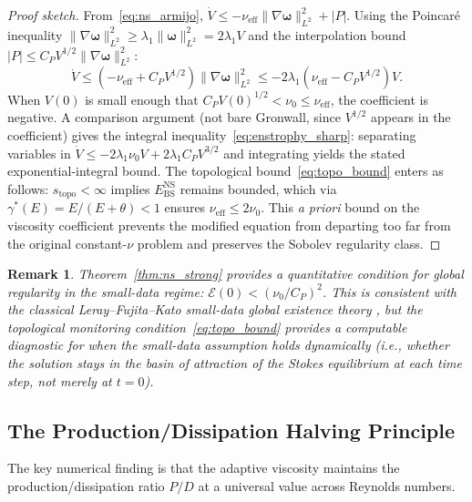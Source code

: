 \documentclass[final]{siamltex}
\newcommand{\norm}[1]{\lVert #1 \rVert}
\providecommand{\grad}{\nabla}
\newcommand{\Ebs}{E_{\mathrm{BS}}}
\newtheorem{remark}[theorem]{Remark}
\begin{document}
\begin{proof}[Proof sketch]
From~\eqref{eq:ns_armijo}, $\dot{V} \le -\nu_{\mathrm{eff}}
\norm{\grad\bm{\omega}}_{L^2}^2 + |P|$.
Using the Poincar\'e inequality
$\norm{\grad\bm{\omega}}_{L^2}^2 \ge \lambda_1
\norm{\bm{\omega}}_{L^2}^2 = 2\lambda_1 V$ and the
interpolation bound $|P| \le C_P V^{1/2}
\norm{\grad\bm{\omega}}_{L^2}^2$:
\[
  \dot{V} \le (-\nu_{\mathrm{eff}}
  + C_P V^{1/2})\norm{\grad\bm{\omega}}_{L^2}^2
  \le -2\lambda_1(\nu_{\mathrm{eff}} - C_P V^{1/2})V.
\]
When $V(0)$ is small enough that $C_P V(0)^{1/2} < \nu_0
\le \nu_{\mathrm{eff}}$, the coefficient is negative.
A comparison argument (not bare Gronwall, since $V^{1/2}$
appears in the coefficient) gives
the integral inequality~\eqref{eq:enstrophy_sharp}: separating
variables in $\dot{V} \le -2\lambda_1\nu_0 V + 2\lambda_1 C_P
V^{3/2}$ and integrating yields the stated exponential-integral
bound.  The topological bound~\eqref{eq:topo_bound} enters as
follows: $s_{\mathrm{topo}} < \infty$ implies
$\Ebs^{\mathrm{NS}}$ remains bounded, which via
$\gamma^*(E) = E/(E{+}\theta) < 1$ ensures
$\nu_{\mathrm{eff}} \le 2\nu_0$. This \emph{a priori} bound
on the viscosity coefficient prevents the modified equation from
departing too far from the original constant-$\nu$ problem and
preserves the Sobolev regularity class.
\end{proof}

\begin{remark}
Theorem~\ref{thm:ns_strong} provides a \emph{quantitative}
condition for global regularity in the small-data regime:
$\mathcal{E}(0) < (\nu_0/C_P)^2$.  This is consistent with
the classical Leray--Fujita--Kato small-data global
existence theory \cite{lady1969}, but the topological
monitoring condition~\eqref{eq:topo_bound} provides a
\emph{computable} diagnostic for when the small-data
assumption holds dynamically (i.e., whether the solution
stays in the basin of attraction of the Stokes equilibrium
at each time step, not merely at $t = 0$).
\end{remark}

\subsection{The Production/Dissipation Halving
Principle}\label{sec:ns:pd}

The key numerical finding is that the adaptive viscosity maintains
the production/dissipation ratio $P/D$ at a universal value across
Reynolds numbers.
\end{document}
